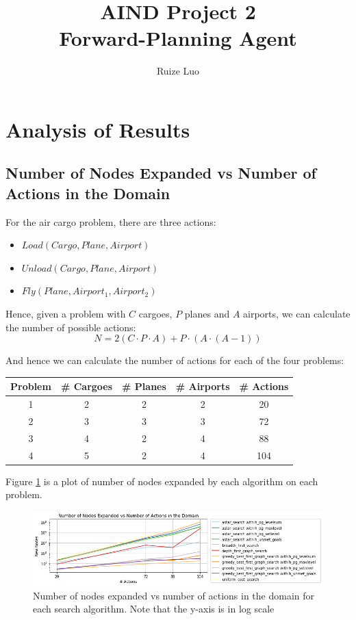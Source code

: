 \documentclass{article}[12pt]
\title{\huge{\textbf{AIND Project 2\\Forward-Planning Agent}}}
\author{\Large{Ruize Luo}}
\begin{document}
	\maketitle
	
	\section{Analysis of Results}
	
		\subsection{Number of Nodes Expanded vs Number of Actions in the Domain} \label{ssc:1.1}
			For the air cargo problem, there are three actions:
			\begin{itemize}
				\item $Load(Cargo, Plane, Airport)$
				\item $Unload(Cargo, Plane, Airport)$
				\item $Fly(Plane, Airport_1, Airport_2)$
			\end{itemize}
			
			Hence, given a problem with $C$ cargoes, $P$ planes and $A$ airports, we can calculate the number of possible actions:
			\begin{equation}
				N = 2(C \cdot P \cdot A) + P \cdot (A \cdot (A - 1))
			\end{equation}
			
			And hence we can calculate the number of actions for each of the four problems:
			\begin{center}
				\begin{tabular}{||c c c c c||} 
					\hline
					Problem & \# Cargoes & \# Planes & \# Airports & \# Actions \\ [0.5ex] 
					\hline\hline
					1 & 2 & 2 & 2 & \hphantom{0}20 \\ 
					\hline
					2 & 3 & 3 & 3 & \hphantom{0}72 \\
					\hline
					3 & 4 & 2 & 4 & \hphantom{0}88 \\
					\hline
					4 & 5 & 2 & 4 & 104 \\
					\hline
				\end{tabular}
			\end{center}
		
			Figure \ref{fig:n_actions_vs_n_nodes} is a plot of number of nodes expanded by each algorithm on each problem.
			
			\begin{figure}[h!]
				\includegraphics[width=\linewidth]{n_actions_vs_n_nodes.png}
				\caption{Number of nodes expanded vs number of actions in the domain for each search algorithm. Note that the y-axis is in log scale}
				\label{fig:n_actions_vs_n_nodes}
			\end{figure}
		
\end{document}
